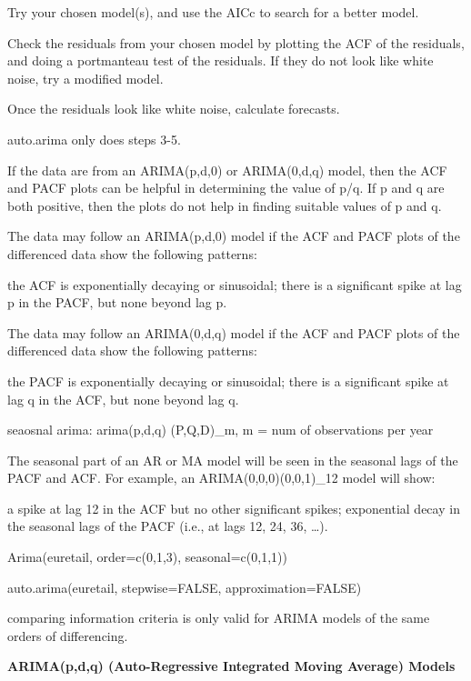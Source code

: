 \documentclass[]{book}
\begin{document}
Try your chosen model(s), and use the AICc to search for a better model.

Check the residuals from your chosen model by plotting the ACF of the residuals, and doing a portmanteau test of the residuals. If they do not look like white noise, try a modified model.

Once the residuals look like white noise, calculate forecasts.

auto.arima only does steps 3-5.

If the data are from an ARIMA(p,d,0) or ARIMA(0,d,q) model, then the ACF and PACF plots can be helpful in determining the value of p/q. If p and q are both positive, then the plots do not help in finding suitable values of p and q.

The data may follow an ARIMA(p,d,0) model if the ACF and PACF plots of the differenced data show the following patterns:

the ACF is exponentially decaying or sinusoidal; there is a significant spike at lag
p in the PACF, but none beyond lag p.

The data may follow an ARIMA(0,d,q) model if the ACF and PACF plots of the differenced data show the following patterns:

the PACF is exponentially decaying or sinusoidal; there is a significant spike at lag
q in the ACF, but none beyond lag q.

seaosnal arima: arima(p,d,q) (P,Q,D)\_m, m = num of observations per year

The seasonal part of an AR or MA model will be seen in the seasonal lags of the PACF and ACF. For example, an ARIMA(0,0,0)(0,0,1)\_12 model will show:

a spike at lag 12 in the ACF but no other significant spikes; exponential decay in the seasonal lags of the PACF (i.e., at lags 12, 24, 36, \ldots{}).

Arima(euretail, order=c(0,1,3), seasonal=c(0,1,1))

auto.arima(euretail, stepwise=FALSE, approximation=FALSE)

comparing information criteria is only valid for ARIMA models of the same orders of differencing.

\textbf{ARIMA(p,d,q) (Auto-Regressive Integrated Moving Average) Models}
\end{document}
